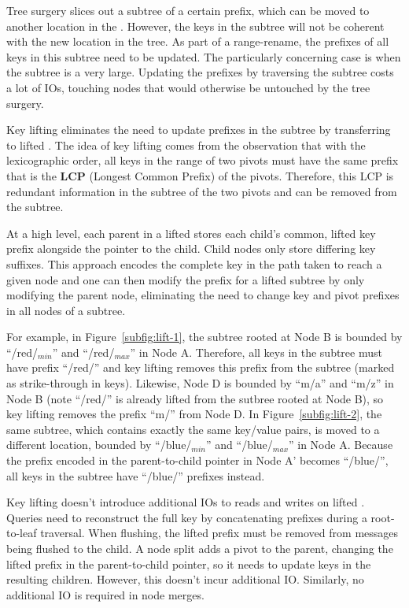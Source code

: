 Tree surgery slices out a subtree of a certain prefix, which can be moved to
another location in the \bet.
However, the keys in the subtree will not be coherent with the new location in
the tree.
As part of a range-rename, the prefixes of all keys in this subtree need to be
updated.
The particularly concerning case is when the subtree is a very large.
Updating the prefixes by traversing the subtree costs a lot of IOs, touching
nodes that would otherwise be untouched by the tree surgery.

Key lifting eliminates the need to update prefixes in the subtree by
transferring \bets to lifted \bets.
The idea of key lifting comes from the observation that with the lexicographic
order, all keys in the range of two pivots must have the same prefix that is
the \textbf{LCP} (Longest Common Prefix) of the pivots.
Therefore, this LCP is redundant information in the subtree of the two pivots
and can be removed from the subtree.

At a high level, each parent in a lifted \bet stores each child's common,
lifted key prefix alongside the pointer to the child.
Child nodes only store differing key suffixes.
This approach encodes the complete key in the path taken to reach a given node
and one can then modify the prefix for a lifted subtree by only modifying the
parent node, eliminating the need to change key and pivot prefixes in all nodes
of a subtree.

For example, in Figure~\ref{subfig:lift-1}, the subtree rooted at Node B is
bounded by ``/red/$_{min}$'' and ``/red/$_{max}$'' in Node A.
Therefore, all keys in the subtree must have prefix ``/red/'' and key lifting
removes this prefix from the subtree (marked as strike-through in keys).
Likewise, Node D is bounded by ``m/a'' and ``m/z'' in Node B
(note ``/red/'' is already lifted from the sutbree rooted at Node B),
so key lifting removes the prefix ``m/'' from Node D.
In Figure~\ref{subfig:lift-2}, the same subtree, which contains exactly the
same key/value pairs, is moved to a different location, bounded by
``/blue/$_{min}$'' and ``/blue/$_{max}$'' in Node A.
Because the prefix encoded in the parent-to-child pointer in Node A' becomes
``/blue/'', all keys in the subtree have ``/blue/'' prefixes instead.

Key lifting doesn't introduce additional IOs to reads and writes on lifted
\bets.
Queries need to reconstruct the full key by concatenating prefixes during a
root-to-leaf traversal.
When flushing, the lifted prefix must be removed from messages being flushed
to the child.
A node split adds a pivot to the parent, changing the lifted prefix in the
parent-to-child pointer, so it needs to update keys in the resulting children.
However, this doesn't incur additional IO.
Similarly, no additional IO is required in node merges.

